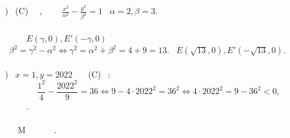 \textPsi \textsigma \eta \\
\\
\textalpha) \textEta \textepsilon \textxi \textiota \textsigma \textomega \textsigma \texteta \ (C) \textalpha \textn \texteta \textkappa \textepsilon \textiota \ \textsigma \textepsilon \ \textupsilon \textpi \textepsilon \textrho \textbeta \textomicron \textbb \textomicron \textbb \texteta, \textdelta \textiota \textomicron \texttau \textiota \ \textepsilon \textiota \textn \textalpha \textiota \ \texttau \texteta \textsigma \ \textmu \textomicron \textrho \textphi \texteta \textsigma \ $\frac{x^2}{\alpha^2} - \frac{y^2}{\beta^2}=1$ \textmu \textepsilon \ $\alpha=2, \beta=3$. \\
\\
\textOmicron \textiota \ \textepsilon \textsigma \texttau \textiota \textepsilon \textsigma \ \texttau \texteta \textsigma \ \textepsilon \textchi \textomicron \textupsilon \textn \ \textsigma \textupsilon \textn \texttau \textepsilon \texttau \textalpha \textgamma \textmu \textepsilon \textn \textepsilon \textsigma \ $E(\gamma,0), E'(-\gamma,0)$ \\
\textomicron \textpi \textomicron \textupsilon \ $\beta^2=\gamma^2-\alpha^2 \Leftrightarrow \gamma^2=\alpha^2+\beta^2=4+9=13$. \textOmicron \textpi \textomicron \texttau \textepsilon \ $E(\sqrt{13},0), E'(-\sqrt{13},0)$. \\
\\
\textbeta) \textGamma \textiota \textalpha \ $x=1, y=2022$ \ \texteta \ \textepsilon \textxi \textiota \textsigma \textomega \textsigma \texteta \ (C) \ \textgamma \textiota \textn \textepsilon \texttau \textalpha \textiota: \\
\[
\frac{1^2}{4} - \frac{2022^2}{9}=36 \Leftrightarrow 9 - 4 \cdot 2022^2=36^2 \Leftrightarrow 4 \cdot 2022^2=9-36^2<0,
\]
\texteta \ \textomicron \textpi \textomicron \textiota \textalpha \ \textdelta \textepsilon \textn \ \textmu \textpi \textomicron \textrho \textepsilon \textiota \ \textn \textalpha \ \textiota \textsigma \textchi \textupsilon \textepsilon \textiota. \\
\\
\textAlpha \textrho \textalpha \ \texttau \textomicron \ \textsigma \texteta \textmu \textepsilon \textiota \textomicron \ M \ \textdelta \textepsilon \textn \ \textmu \textpi \textomicron \textrho \textepsilon \textiota \ \textn \textalpha \ \textalpha \textn \texteta \textkappa \textepsilon \textiota \ \textsigma \texttau \texteta \textn \ \textupsilon \textpi \textepsilon \textrho \textbeta \textomicron \textbb \textomicron \textbb \texteta. \\
